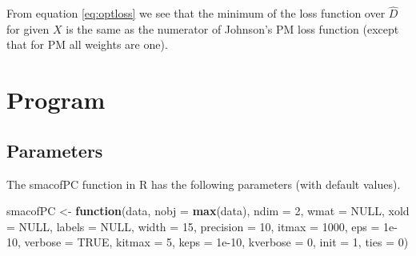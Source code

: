 \documentclass[
  12pt,
]{article}
\newenvironment{Shaded}{\begin{snugshade}}{\end{snugshade}}
\newcommand{\AttributeTok}[1]{\textcolor[rgb]{0.13,0.29,0.53}{#1}}
\newcommand{\ConstantTok}[1]{\textcolor[rgb]{0.56,0.35,0.01}{#1}}
\newcommand{\ControlFlowTok}[1]{\textcolor[rgb]{0.13,0.29,0.53}{\textbf{#1}}}
\newcommand{\DecValTok}[1]{\textcolor[rgb]{0.00,0.00,0.81}{#1}}
\newcommand{\FloatTok}[1]{\textcolor[rgb]{0.00,0.00,0.81}{#1}}
\newcommand{\FunctionTok}[1]{\textcolor[rgb]{0.13,0.29,0.53}{\textbf{#1}}}
\newcommand{\NormalTok}[1]{#1}
\newcommand{\OtherTok}[1]{\textcolor[rgb]{0.56,0.35,0.01}{#1}}
\begin{document}
From equation \eqref{eq:optloss} we see that the minimum of the loss function over \(\hat D\) for given \(X\) is the same as the numerator of Johnson's PM loss function (except that for PM all weights are one).

\section{Program}\label{program}

\subsection{Parameters}\label{parameters}

The smacofPC function in R has the following parameters (with default values).

\begin{Shaded}
\begin{Highlighting}[]
\NormalTok{smacofPC }\OtherTok{\textless{}{-}} \ControlFlowTok{function}\NormalTok{(data,}
                     \AttributeTok{nobj =} \FunctionTok{max}\NormalTok{(data),}
                     \AttributeTok{ndim =} \DecValTok{2}\NormalTok{,}
                     \AttributeTok{wmat =} \ConstantTok{NULL}\NormalTok{,}
                     \AttributeTok{xold =} \ConstantTok{NULL}\NormalTok{,}
                     \AttributeTok{labels =} \ConstantTok{NULL}\NormalTok{,}
                     \AttributeTok{width =} \DecValTok{15}\NormalTok{,}
                     \AttributeTok{precision =} \DecValTok{10}\NormalTok{,}
                     \AttributeTok{itmax =} \DecValTok{1000}\NormalTok{,}
                     \AttributeTok{eps =} \FloatTok{1e{-}10}\NormalTok{,}
                     \AttributeTok{verbose =} \ConstantTok{TRUE}\NormalTok{,}
                     \AttributeTok{kitmax =} \DecValTok{5}\NormalTok{,}
                     \AttributeTok{keps =} \FloatTok{1e{-}10}\NormalTok{,}
                     \AttributeTok{kverbose =} \DecValTok{0}\NormalTok{,}
                     \AttributeTok{init =} \DecValTok{1}\NormalTok{,}
                     \AttributeTok{ties =} \DecValTok{0}\NormalTok{)}
\end{Highlighting}
\end{Shaded}
\end{document}
